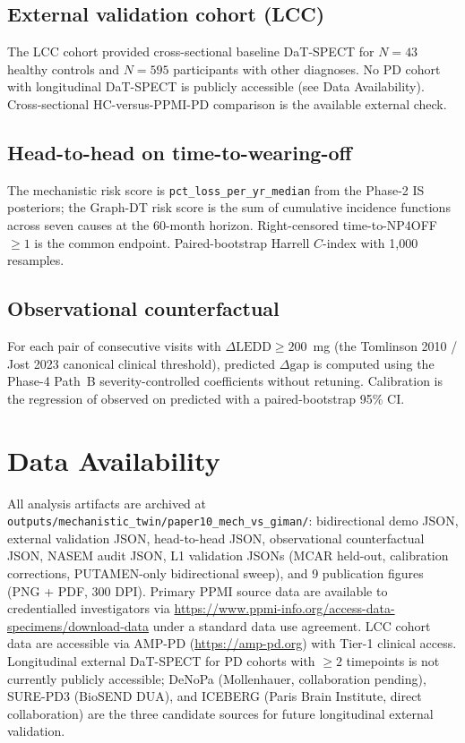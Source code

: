 \subsection{External validation cohort (LCC)}

The LCC cohort provided cross-sectional baseline DaT-SPECT for $N = 43$ healthy controls and $N = 595$ participants with other diagnoses. No PD cohort with longitudinal DaT-SPECT is publicly accessible (see Data Availability). Cross-sectional HC-versus-PPMI-PD comparison is the available external check.

\subsection{Head-to-head on time-to-wearing-off}

The mechanistic risk score is \texttt{pct\_loss\_per\_yr\_median} from the Phase-2 IS posteriors; the Graph-DT\cite{dupre2026paper3} risk score is the sum of cumulative incidence functions across seven causes at the 60-month horizon. Right-censored time-to-NP4OFF $\geq 1$ is the common endpoint. Paired-bootstrap Harrell $C$-index with 1{,}000 resamples.

\subsection{Observational counterfactual}

For each pair of consecutive visits with $\Delta\mathrm{LEDD} \geq 200$~mg (the Tomlinson 2010\cite{tomlinson2010ledd} / Jost 2023\cite{jost2023ledd} canonical clinical threshold), predicted $\Delta\text{gap}$ is computed using the Phase-4 Path~B\cite{dupre2026paper9} severity-controlled coefficients without retuning. Calibration is the regression of observed on predicted with a paired-bootstrap 95\% CI.

\section{Data Availability}

All analysis artifacts are archived at \texttt{outputs/mechanistic\_twin/paper10\_mech\_vs\_giman/}: bidirectional demo JSON, external validation JSON, head-to-head JSON, observational counterfactual JSON, NASEM audit JSON, L1 validation JSONs (MCAR held-out, calibration corrections, PUTAMEN-only bidirectional sweep), and 9 publication figures (PNG + PDF, 300 DPI). Primary PPMI source data are available to credentialled investigators via \url{https://www.ppmi-info.org/access-data-specimens/download-data} under a standard data use agreement. LCC cohort data are accessible via AMP-PD (\url{https://amp-pd.org}) with Tier-1 clinical access. Longitudinal external DaT-SPECT for PD cohorts with $\geq 2$ timepoints is not currently publicly accessible; DeNoPa (Mollenhauer, collaboration pending), SURE-PD3 (BioSEND DUA), and ICEBERG (Paris Brain Institute, direct collaboration) are the three candidate sources for future longitudinal external validation.


